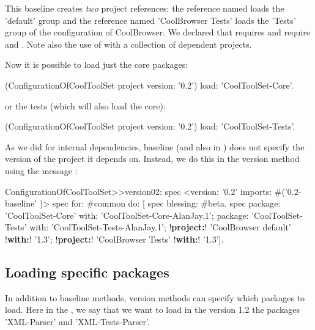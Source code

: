 \documentclass[a4paper,10pt,twoside]{book}
\begin{document}
This baseline creates \emph{two} project references: the reference named  loads the 'default' group and the reference named 'CoolBrowser Tests'  loads the 'Tests' group of the configuration of CoolBrowser. We declared that  requires  and  require \mbox{} and . Note also the use of  with a collection of dependent projects.

Now it is possible to load just the core packages:

\begin{code}{}
(ConfigurationOfCoolToolSet project version: '0.2') load: 'CoolToolSet-Core'.
\end{code}

\noindent
or the tests (which will also load the core):
\begin{code}{}
  (ConfigurationOfCoolToolSet project version: '0.2') load: 'CoolToolSet-Tests'.
\end{code}

As we did for internal dependencies, baseline  (and also in ) does not specify the version of the project it depends on. Instead, we do this in the version method using the message : 
\begin{code}{}
ConfigurationOfCoolToolSet>>version02: spec 
       <version: '0.2' imports: #('0.2-baseline' )>
       spec for: #common do: [
              spec blessing: #beta.
              spec 
                     package: 'CoolToolSet-Core' with: 'CoolToolSet-Core-AlanJay.1';
                     package: 'CoolToolSet-Tests' with: 'CoolToolSet-Tests-AlanJay.1';
                     !\textbf{project:}! 'CoolBrowser default' !\textbf{with:}! '1.3';
                     !\textbf{project:}! 'CoolBrowser Tests' !\textbf{with:}! '1.3'].
\end{code}

\subsection{Loading specific packages}

In addition to baseline methods, version methods can specify
which packages to load. Here in the , we say
that we want to load in the version 1.2 the packages 'XML-Parser' and
'XML-Tests-Parser'.
\end{document}
